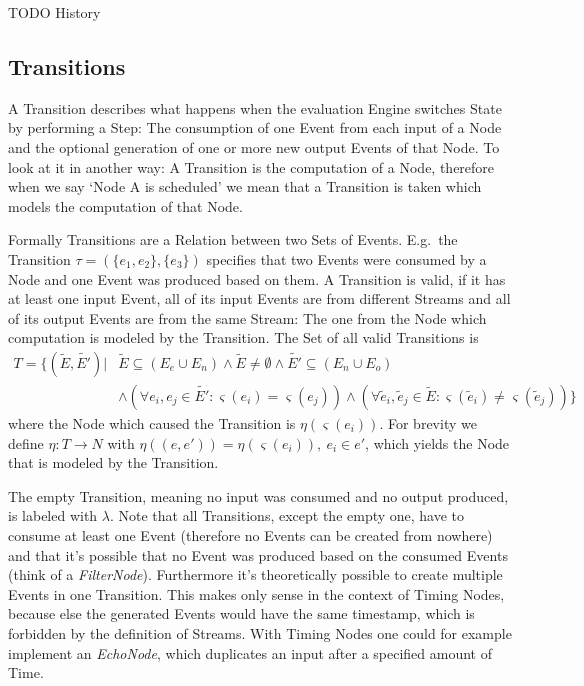 TODO History

\subsection{Transitions}
\label{sec:concepts:def:transitions}

A Transition describes what happens when the evaluation Engine switches State by performing a Step:
The consumption of one Event from each input of a Node and the optional generation of one or more new output Events of that Node.
To look at it in another way: A Transition is the computation of a Node, therefore when we say `Node A is scheduled' we mean that a Transition is taken which models the computation of that Node.

Formally Transitions are a Relation between two Sets of Events.
E.g.\ the Transition \(\tau = (\{e_1,e_2\}, \{e_3\})\) specifies that two Events were consumed by a Node and one Event was produced based on them.
A Transition is valid, if it has at least one input Event, all of its input Events are from different Streams and all of its output Events are from the same Stream: The one from the Node which computation is modeled by the Transition.
The Set of all valid Transitions is
\begin{align*}
  T = \{(\widetilde{E}, \widetilde{E'}) | &\widetilde{E} \subseteq (E_e \cup E_n) \land \widetilde{E} \neq \emptyset \land \widetilde{E'} \subseteq (E_n \cup E_o)\\
&\land (\forall e_i, e_j \in \widetilde{E'}: \varsigma(e_i) = \varsigma(e_j)) \land (\forall \widetilde{e}_i, \widetilde{e}_j \in \widetilde{E}: \varsigma(\widetilde{e}_i) \neq \varsigma(\widetilde{e}_j))\}
\end{align*}
where the Node which caused the Transition is \(\eta(\varsigma(e_i))\).
For brevity we define \(\eta : T \rightarrow N\) with \(\eta((e, e')) = \eta(\varsigma(e_i)),\ e_i \in e'\), which yields the Node that is modeled by the Transition.

The empty Transition, meaning no input was consumed and no output produced, is labeled with \(\lambda\).
Note that all Transitions, except the empty one, have to consume at least one Event (therefore no Events can be created from nowhere) and that it's possible that no Event was produced based on the consumed Events (think of a \emph{FilterNode}).
Furthermore it's theoretically possible to create multiple Events in one Transition.
This makes only sense in the context of Timing Nodes, because else the generated Events would have the same timestamp, which is forbidden by the definition of Streams.
With Timing Nodes one could for example implement an \emph{EchoNode}, which duplicates an input after a specified amount of Time.

